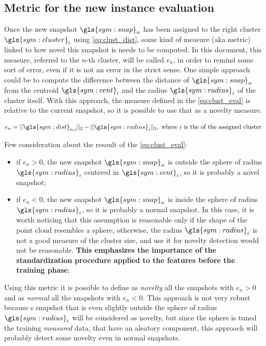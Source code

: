 \subsection{Metric for the new instance evaluation}
\label{sec:clust_metric}
Once the new snapshot $\gls{sym:snap}_n$ has been assigned to the right cluster $\gls{sym:cluster}_i$ using \autoref{eq:clust_dist}, some kind of measure (\gls{aka} metric) linked to how novel this snapshot is needs to be computed. In this document, this measure, referred to the $n$-th cluster, will be called $e_n$, in order to remind some sort of error, even if it is not an error in the strict sense. One simple approach could be to compute the difference between the distance of $\gls{sym:snap}_n$ from the centroid $\gls{sym:cent}_i$ and the radius $\gls{sym:radius}_i$ of the cluster itself. With this approach, the measure defined in the \autoref{eq:clust_eval} is relative to the current snapshot, so it is possible to use that as a novelty measure.

\begin{equation}
  \label{eq:clust_eval}
  e_{n} = ||\gls{sym:dist}_{n,i}||_2 - ||\gls{sym:radius}_{i}||_2, \text{ where $i$ is the of the assigned cluster}
\end{equation}

Few consideration about the resoult of the \autoref{eq:clust_eval}:
\begin{itemize}
  \item if $e_{n} > 0$, the new snapshot $\gls{sym:snap}_n$ is outside the sphere of radius $\gls{sym:radius}_i$ centered in $\gls{sym:cent}_i$, so it is probably a novel snapshot;
  \item if $e_{n} < 0$, the new snapshot $\gls{sym:snap}_n$ is inside the sphere of radius $\gls{sym:radius}_i$, so it is probably a normal snapshot. In this case, it is worth noticing that this assumption is reasonable only if the shape of the point cloud resembles a sphere, otherwise, the radius $\gls{sym:radius}_i$ is not a good measure of the cluster size, and use it for novelty detection would not be reasonable. \textbf{This emphasizes the importance of the standardization procedure applied to the features before the training phase};
\end{itemize}



Using this metric it is possible to define as \emph{novelty} all the snapshots with $e_{n} > 0$ and as \emph{normal} all the snapshots with $e_{n} < 0$. This approach is not very robust because s snapshot that is even slightly outside the sphere of radius $\gls{sym:radius}_i$ will be considered as novelty, but since the sphere is tuned the training \emph{measured} data, that have an aleatory component, this approach will probably detect some novelty even in normal snapshots.

